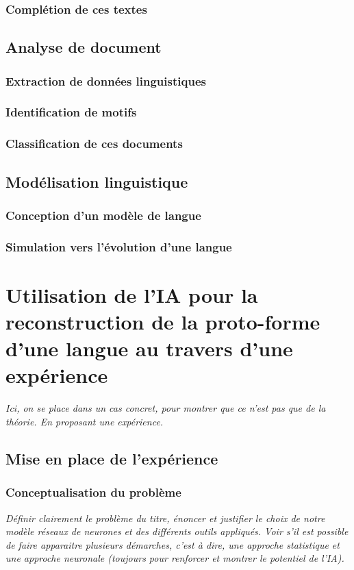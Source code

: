 \documentclass[12pt, letterpaper, french]{report}
\begin{document}
\subsection{Complétion de ces textes}
\section{Analyse de document}
\subsection{Extraction de données linguistiques}
\subsection{Identification de motifs}
\subsection{Classification de ces documents}
\section{Modélisation linguistique}
\subsection{Conception d'un modèle de langue}
\subsection{Simulation vers l'évolution d'une langue}

\chapter{Utilisation de l'IA pour la reconstruction de la proto-forme d'une langue au travers d'une expérience}
\textit{Ici, on se place dans un cas concret, pour montrer que ce n'est pas que de la théorie. En proposant une expérience.}
\section{Mise en place de l'expérience}
\subsection{Conceptualisation du problème}
\textit{Définir clairement le problème du titre, énoncer et justifier le choix de notre modèle réseaux de neurones et des différents outils appliqués. Voir s'il est possible de faire apparaitre plusieurs démarches, c'est à dire, une approche statistique et une approche neuronale (toujours pour renforcer et montrer le potentiel de l'IA).}
\end{document}
